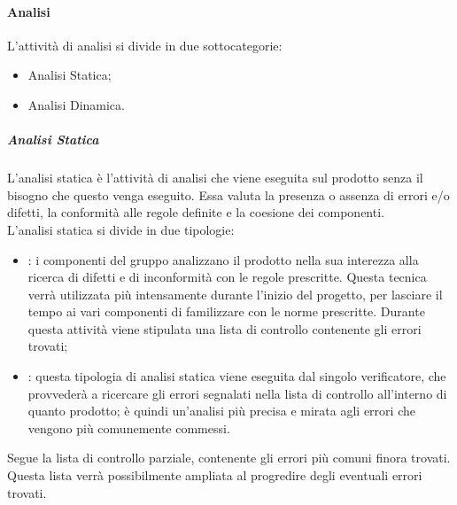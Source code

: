 \documentclass[../norme-di-progetto.tex]{subfiles}
\begin{document}
\paragraph{Analisi}
L'attività di analisi si divide in due sottocategorie:
\begin{itemize}
  \item Analisi Statica;
  \item Analisi Dinamica.
\end{itemize}
\subparagraph{Analisi Statica}
L'analisi statica è l'attività di analisi che viene eseguita sul prodotto senza il bisogno che questo venga eseguito. Essa valuta la presenza o assenza di errori e/o difetti, la conformità alle regole definite e la coesione dei componenti. \\
L'analisi statica si divide in due tipologie:
\begin{itemize}
  \item \textbf{}: i componenti del gruppo analizzano il prodotto nella sua interezza alla ricerca di difetti e di inconformità con le regole prescritte. Questa tecnica verrà utilizzata più intensamente durante l'inizio del progetto, per lasciare il tempo ai vari componenti di familizzare con le norme prescritte. Durante questa attività viene stipulata una lista di controllo contenente gli errori trovati;
  \item \textbf{}: questa tipologia di analisi statica viene eseguita dal singolo verificatore, che provvederà a ricercare gli errori segnalati nella lista di controllo all'interno di quanto prodotto; è quindi un'analisi più precisa e mirata agli errori che vengono più comunemente commessi.
\end{itemize}
Segue la lista di controllo parziale, contenente gli errori più comuni finora trovati. Questa lista verrà possibilmente ampliata al progredire degli eventuali errori trovati.
\end{document}
